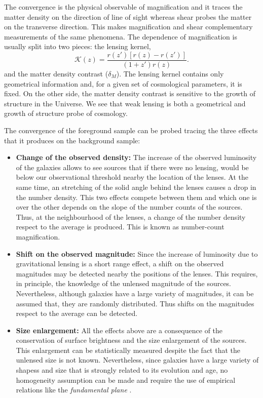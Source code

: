 The convergence is the physical observable of magnification and it traces the matter density on the direction of line of sight whereas shear probes the matter on the transverse direction. This makes magnification and shear complementary measurements of the same phenomena. The dependence of magnification is usually split into two pieces: the lensing kernel,
\begin{equation}
\mathcal{K}(z) = \frac{r(z')[r(z)-r(z')]}{(1+z')r(z)}.
\end{equation}
and the matter density contrast ($\delta_M$). The lensing kernel contains only geometrical information and, for a given set of cosmological parameters, it is fixed. On the other side, the matter density contrast is sensitive to the growth of structure in the Universe. We see that weak lensing is both a geometrical and growth of structure probe of cosmology.
\newline

The convergence of the foreground sample can be probed tracing the three effects that it produces on the background sample:
\begin{itemize}
\item {\bf Change of the observed density:} The increase of the observed luminosity of the galaxies allows to see sources that if there were no lensing, would be below our observational threshold nearby the location of the lenses. At the same time, an stretching of the solid angle behind the lenses causes a drop in the number density. This two effects compete between them and which one is over the other depends on the slope of the number counts of the sources. Thus, at the neighbourhood of the lenses, a change of the number density respect to the average is produced. This is known as number-count magnification.
\item {\bf Shift on the observed magnitude:} Since the increase of luminosity due to gravitational lensing is a short range effect, a shift on the observed magnitudes may be detected nearby the positions of the lenses. This requires, in principle, the knowledge of the unlensed magnitude of the sources. Nevertheless, although galaxies have a large variety of magnitudes, it can be assumed that, they are randomly distributed. Thus shifts on the magnitudes respect to the average can be detected.
\item {\bf Size enlargement:} All the effects above are a consequence of the conservation of surface brightness and the size enlargement of the sources. This enlargement can be statistically measured despite the fact that the unlensed size is not known. Nevertheless, since galaxies have a large variety of shapess and size that is strongly related to its evolution and age, no homogeneity assumption can be made and require the use of empirical relations like the {\it fundamental plane} \cite{2003AJ....125.1866B,2041-8205-780-2-L16}.
\end{itemize}

